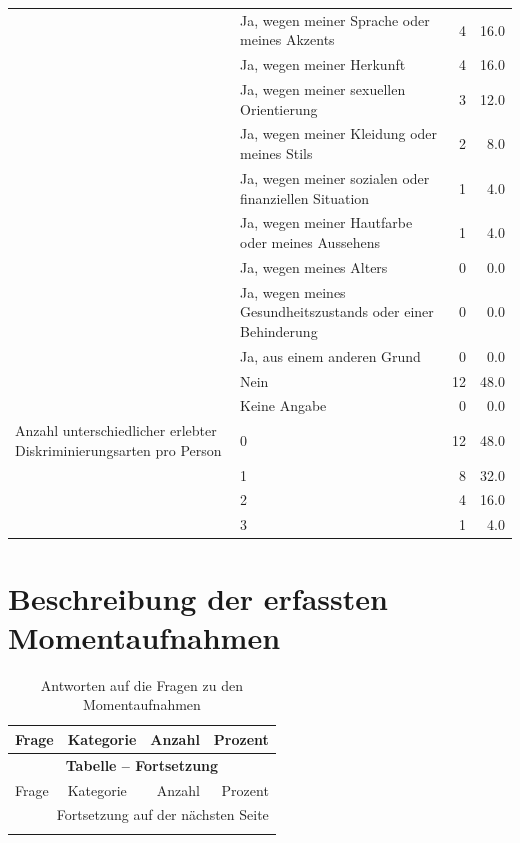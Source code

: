 \begin{appendices}
\begin{longtable}{p{5.5cm}p{5.5cm}rr}
     & Ja, wegen meiner Sprache oder meines Akzents & 4 & 16.0 \\*
     & Ja, wegen meiner Herkunft & 4 & 16.0 \\*
     & Ja, wegen meiner sexuellen Orientierung & 3 & 12.0 \\*
     & Ja, wegen meiner Kleidung oder meines Stils & 2 & 8.0 \\*
     & Ja, wegen meiner sozialen oder finanziellen Situation & 1 & 4.0 \\*
     & Ja, wegen meiner Hautfarbe oder meines Aussehens & 1 & 4.0 \\*
     & Ja, wegen meines Alters & 0 & 0.0 \\*
     & Ja, wegen meines Gesundheitszustands oder einer Behinderung & 0 & 0.0 \\*
     & Ja, aus einem anderen Grund & 0 & 0.0 \\*
     & Nein & 12 & 48.0 \\*
     & Keine Angabe & 0 & 0.0 \\
     \midrule
    \addlinespace
    Anzahl unterschiedlicher erlebter Diskriminierungsarten pro Person & 0 & 12 & 48.0 \\*
     & 1 & 8 & 32.0 \\*
     & 2 & 4 & 16.0 \\*
     & 3 & 1 & 4.0 \\
     \bottomrule
\end{longtable}

\clearpage
\section{Beschreibung der erfassten Momentaufnahmen}
\label{app:appendix_moments}

\begin{longtable}{p{5.5cm}p{5.5cm}rr}
    \caption{Antworten auf die Fragen zu den Momentaufnahmen}
    \label{tab:moments}\\
    \toprule
    Frage & Kategorie & Anzahl & Prozent \\
    \midrule
    \endfirsthead

    \multicolumn{4}{c}{{\bfseries Tabelle \thetable{} -- Fortsetzung}} \\
    \toprule
    Frage & Kategorie & Anzahl & Prozent \\
    \midrule
    \endhead
    
    \midrule
    \multicolumn{4}{r}{Fortsetzung auf der nächsten Seite}\\
    \endfoot
    

\end{longtable}
\end{appendices}
